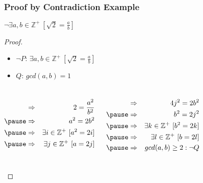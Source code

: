 \documentclass[dvipsnames]{beamer}
\begin{document}
\begin{frame}
  \frametitle{Proof by Contradiction Example}

  \begin{theorem}
    $\neg \exists a,b \in \mathbb{Z}^+~[\sqrt{2}=\frac{a}{b}]$
  \end{theorem}

  \pause
  \begin{proof}
    \begin{itemize}
      \item $\neg P$: $\exists a,b \in \mathbb{Z}^+~[\sqrt{2}=\frac{a}{b}]$
      \item $Q$: $gcd(a,b)=1$
    \end{itemize}

    \pause
    \vspace{-0.7cm}
    \begin{columns}[t]
      \begin{eqnarray*}
        & \Rightarrow & 2 = \frac{a^2}{b^2}\\\pause
        & \Rightarrow & a^2 = 2b^2\\\pause
        & \Rightarrow & \exists i \in \mathbb{Z}^+~[a^2=2i]\\\pause
        & \Rightarrow & \exists j \in \mathbb{Z}^+~[a=2j]
      \end{eqnarray*}

      \pause
      \begin{eqnarray*}
        & \Rightarrow & 4j^2 = 2b^2\\\pause
        & \Rightarrow & b^2 = 2j^2\\\pause
        & \Rightarrow & \exists k \in \mathbb{Z}^+~[b^2=2k]\\\pause
        & \Rightarrow & \exists l \in \mathbb{Z}^+~[b=2l]\\\pause
        & \Rightarrow & gcd(a,b) \geq 2: \neg Q
      \end{eqnarray*}
    \end{columns}
  \end{proof}
\end{frame}
\end{document}
